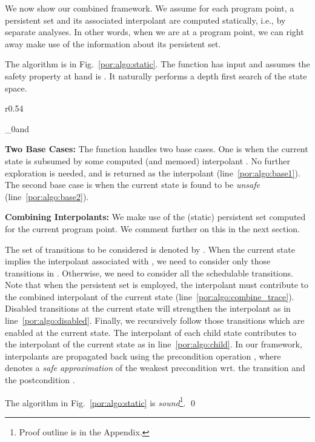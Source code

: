 We now show our combined framework.
We assume for each program point, a persistent set and its associated interpolant 
are computed statically, 
i.e., by separate analyses.
In other words, when we are at a program point, we can right away make use of 
the information about its persistent set.




The algorithm is in Fig.~\ref{por:algo:static}. 
The function  has input  and 
assumes the safety property at hand is .
It naturally performs a depth first search of the state space.

\begin{wrapfigure}{r}{0.54\textwidth}\begin{center}
\vspace{-2mm}
\pppreset
\small{
\safetys_0\symstate\pair{\pc}{\unknown}and
}
\end{center}
\vspace{-10pt}
\caption{A Framework for POR and SI (DFS)} 
\label{por:algo:static}
\end{wrapfigure}



\noindent \textbf{Two Base Cases:} The function  handles two base cases. 
One is when the current state is subsumed by some computed 
(and memoed) interpolant .
No further exploration is needed, and  is returned as the interpolant 
(line~\ref{por:algo:base1}). 
The second base case is when the current state is found to be \emph{unsafe}
(line~\ref{por:algo:base2}).

\vspace{2pt}
\noindent \textbf{Combining Interpolants:} 
We make use of the (static) persistent set  computed for the current program point.
We comment further on this in the next section. 


The set of transitions to be considered is denoted by .
When the current state implies the interpolant  associated with ,
we need to consider only those transitions in . Otherwise, we need to consider
all the schedulable transitions. 
Note that when the persistent set  is employed,
the  interpolant  must contribute to the combined interpolant 
of the current state (line~\ref{por:algo:combine_trace}).
Disabled transitions at the current state will strengthen the interpolant 
as in line~\ref{por:algo:disabled}.
Finally, we recursively follow those transitions which 
are enabled at the current state.
The interpolant of each child state contributes to the interpolant of the current state as
in line~\ref{por:algo:child}. In our framework, interpolants
are propagated back using the precondition operation \wpc,
where  denotes a \emph{safe approximation} of the weakest precondition
wrt. the transition  and the postcondition  \cite{dijkstrawp}.








\begin{theorem}
The algorithm in Fig.~\ref{por:algo:static} is 
\emph{sound}\footnote{Proof outline is in the Appendix.}. 
\qed
\end{theorem}











